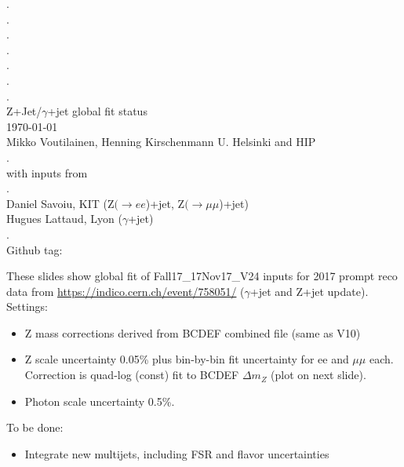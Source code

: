 \documentclass[landscape,10pt]{beamer} %
\begin{document}
\begin{centering}
{. }\\
{. }\\
{. }\\
{. }\\
{. }\\
{. }\\
{. }\\
Z+Jet/$\gamma$+jet global fit status\\
\today\\
Mikko Voutilainen, Henning Kirschenmann
U. Helsinki and HIP\\
.\\
with inputs from\\
.\\
Daniel Savoiu, KIT (Z$(\rightarrow ee$)+jet, Z$(\rightarrow \mu\mu$)+jet)\\
Hugues Lattaud, Lyon ($\gamma$+jet)\\
.\\
Github tag: \\
\end{centering}
\newpage

These slides show global fit of Fall17\_17Nov17\_V24 inputs for 2017 prompt reco data from \url{https://indico.cern.ch/event/758051/} ($\gamma$+jet and Z+jet update). Settings:
\begin{itemize}
\item Z mass corrections derived from BCDEF combined file (same as V10)
\item Z scale uncertainty 0.05\% plus bin-by-bin fit uncertainty for ee and $\mu\mu$ each. Correction is quad-log (const) fit to BCDEF $\Delta m_Z$ (plot on next slide).
\item Photon scale uncertainty 0.5\%.
\end{itemize}

To be done:
\begin{itemize}
\item Integrate new multijets, including FSR and flavor uncertainties
\end{itemize}
\end{document}
